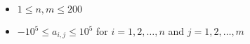 \begin{itemize}
\tightlist
\item $1 \leq n, m \leq 200$
\item $-10^5 \leq a_{i, j} \leq 10^5$ for $i = 1, 2, \ldots, n$ and $j = 1, 2, \ldots, m$
\end{itemize}

